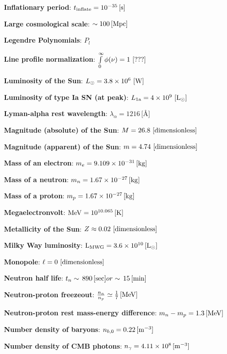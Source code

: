 \documentclass[a4paper,11pt]{article}
\begin{document}
{\noindent}\textbf{Inflationary period}: $t_\mathrm{inflate} = 10^{-35}\,[{\rm s}]$

{\noindent}\textbf{Large cosmological scale}: $\sim 100\,[{\rm Mpc}]$

{\noindent}\textbf{Legendre Polynomials}: $P_l$

{\noindent}\textbf{Line profile normalization}: $\int\limits_0^\infty \phi(\nu)=1 ~ [{\rm ???}]$

{\noindent}\textbf{Luminosity of the Sun}: $L_\odot=3.8\times10^6 ~ [{\rm W}]$

{\noindent}\textbf{Luminosity of type Ia SN (at peak)}: $L_\mathrm{1a}=4\times10^9 ~ [{\rm L_\odot}]$

{\noindent}\textbf{Lyman-alpha rest wavelength}: $\lambda_\alpha = 1216$\,[\AA]

{\noindent}\textbf{Magnitude (absolute) of the Sun}: $M = 26.8 ~ [{\rm dimensionless}]$

{\noindent}\textbf{Magnitude (apparent) of the Sun}: $m = 4.74 ~ [{\rm dimensionless}]$

{\noindent}\textbf{Mass of an electron}: $m_e = 9.109\times10^{-31}\,[{\rm kg}]$

{\noindent}\textbf{Mass of a neutron}: $m_n = 1.67\times10^{-27}\,[{\rm kg}]$

{\noindent}\textbf{Mass of a proton}: $m_p = 1.67\times10^{-27}\,[{\rm kg}]$

{\noindent}\textbf{Megaelectronvolt}: ${\rm MeV} = 10^{10.065}\,[{\rm K}]$

{\noindent}\textbf{Metallicity of the Sun}: $Z\approx0.02 ~ [{\rm dimensionless}]$

{\noindent}\textbf{Milky Way luminosity}: ${\rm L_{MWG}} = 3.6\times10^{10}\,[{\rm L}_\odot]$

{\noindent}\textbf{Monopole}: $\ell=0 ~ [{\rm dimensionless}]$

{\noindent}\textbf{Neutron half life}: $t_n\sim\,890\,[{\rm sec}] or \sim\,15\,[{\rm min}]$

{\noindent}\textbf{Neutron-proton freezeout}: $\frac{n_n}{n_p} \simeq \frac{1}{7}\,[{\rm MeV}]$

{\noindent}\textbf{Neutron-proton rest mass-energy difference}: $m_n - m_p = 1.3\,[{\rm MeV}]$

{\noindent}\textbf{Number density of baryons}: $n_{b,0} = 0.22\,[{\rm m^{-3}}]$

{\noindent}\textbf{Number density of CMB photons}: $n_\gamma= 4.11\times10^8\,[{\rm m^{-3}}]$
\end{document}
